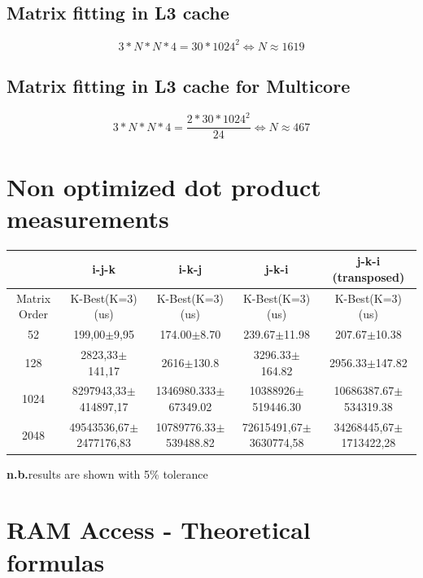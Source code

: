 \documentclass{article}
\begin{document}
\begin{appendices}
\subsection{Matrix fitting in L3 cache}
\begin{equation}
3*N*N*4 = 30*1024^2 \Leftrightarrow N \approx 1619
\end{equation}

\subsection{Matrix fitting in L3 cache for Multicore}
\begin{equation}
3*N*N*4 = \frac{2*30*1024^2}{24} \Leftrightarrow N \approx 467
\end{equation}

\section{Non optimized dot product measurements}
\label{non_optimized}
\begin{tabular}{|c|c|c|c|c|}
\hline
              & {i-j-k}                     & i-k-j                        & j-k-i                    & j-k-i (transposed)                \\
\hline
Matrix Order  & K-Best(K=3)(us)             & K-Best(K=3)(us)              & K-Best(K=3)(us)          & K-Best(K=3)(us)                   \\ 
\hline \hline
 52           & 199,00$\pm$9,95            & 174.00$\pm$8.70             & 239.67$\pm$11.98        & 207.67$\pm$10.38                 \\
\hline
 128          & 2823,33$\pm$141,17         & 2616$\pm$130.8              & 3296.33$\pm$164.82      & 2956.33$\pm$147.82               \\
\hline
 1024         & 8297943,33$\pm$414897,17   & 1346980.333$\pm$67349.02    & 10388926$\pm$519446.30  & 10686387.67$\pm$534319.38        \\
\hline
 2048         & 49543536,67$\pm$2477176,83 & 10789776.33$\pm$539488.82   & 72615491,67$\pm$3630774,58 & 34268445,67$\pm$1713422,28    \\ 
\hline
\end{tabular}
\newline

\footnotesize{\textbf{n.b.}results are shown with 5\% tolerance}

\section{RAM Access - Theoretical formulas}

\end{appendices}
\end{document}
